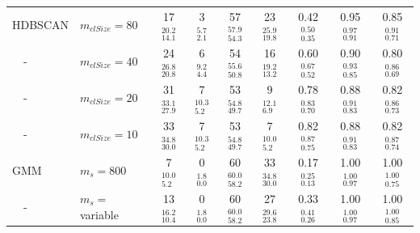 \begin{table}
\begin{tabular}{l l | c c c c | c c c}
HDBSCAN   & $m_{clSize} = 80$            & 17 $^{20.2}_{14.1}$ & 3 $^{5.7}_{2.1}$ & 57 $^{57.9}_{54.3}$ & 23 $^{25.9}_{19.8}$ & 0.42 $^{0.50}_{0.35}$ & 0.95 $^{0.97}_{0.91}$ & 0.85 $^{0.91}_{0.71}$ \rule{0pt}{0.35cm}\\[0.1cm]
$\quad$-  & $m_{clSize} = 40$            & 24 $^{26.8}_{20.8}$ & 6 $^{9.2}_{4.4}$ & 54 $^{55.6}_{50.8}$ & 16 $^{19.2}_{13.2}$ & 0.60 $^{0.67}_{0.52}$ & 0.90 $^{0.93}_{0.85}$ & 0.80 $^{0.86}_{0.69}$ \\[0.1cm]
$\quad$-  & $m_{clSize} = 20$            & 31 $^{33.1}_{27.9}$ & 7 $^{10.3}_{5.2}$ & 53 $^{54.8}_{49.7}$ & 9 $^{12.1}_{6.9}$ & 0.78 $^{0.83}_{0.70}$ & 0.88 $^{0.91}_{0.83}$ & 0.82 $^{0.86}_{0.73}$ \\[0.1cm]
$\quad$-  & $m_{clSize} = 10$            & 33 $^{34.8}_{30.0}$ & 7 $^{10.3}_{5.2}$ & 53 $^{54.8}_{49.7}$ & 7 $^{10.0}_{5.2}$ & 0.82 $^{0.87}_{0.75}$ & 0.88 $^{0.91}_{0.83}$ & 0.82 $^{0.87}_{0.74}$ \\[0.1cm]

\hline

GMM       & $m_{s} = 800$                & 7 $^{10.0}_{5.2}$ & 0 $^{1.8}_{0.0}$ & 60 $^{60.0}_{58.2}$ & 33 $^{34.8}_{30.0}$ & 0.17 $^{0.25}_{0.13}$ & 1.00 $^{1.00}_{0.97}$ & 1.00 $^{1.00}_{0.75}$ \rule{0pt}{0.35cm}\\[0.1cm]
$\quad$-  & $m_{s} = $ variable          & 13 $^{16.2}_{10.4}$ & 0 $^{1.8}_{0.0}$ & 60 $^{60.0}_{58.2}$ & 27 $^{29.6}_{23.8}$ & 0.33 $^{0.41}_{0.26}$ & 1.00 $^{1.00}_{0.97}$ & 1.00 $^{1.00}_{0.85}$ \\[0.1cm]



\hline                                             %
\end{tabular}


\end{table}

